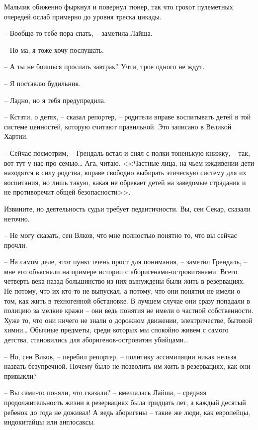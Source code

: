 Мальчик обиженно фыркнул и повернул тюнер, так что грохот пулеметных очередей ослаб примерно до уровня треска цикады.

-- Вообще-то тебе пора спать, -- заметила Лайша.

-- Но ма, я тоже хочу послушать.

-- А ты не боишься проспать завтрак? Учти, трое одного не ждут.

-- Я поставлю будильник.

-- Ладно, но я тебя предупредила.

-- Кстати, о детях, -- сказал репортер, -- родители вправе воспитывать детей в той системе ценностей, которую считают правильной. Это записано в Великой Хартии.

-- Сейчас посмотрим, -- Грендаль встал и снял с полки тоненькую книжку, -- так, вот тут у нас про семью\ldots{} Ага, читаю. <<Частные лица, на чьем иждивении дети находятся в силу родства, вправе свободно выбирать этическую систему для их воспитания, но лишь такую, какая не обрекает детей на заведомые страдания и не противоречит общей безопасности>>.

Извините, но деятельность судьи требует педантичности. Вы, сен Секар, сказали неточно.

-- Не могу сказать, сен Влков, что мне полностью понятно то, что вы сейчас прочли.

-- На самом деле, этот пункт очень прост для понимания, -- заметил Грендаль, -- мне его объясняли на примере истории с аборигенами-островитянами. Всего четверть века назад большинство из них вынуждены были жить в резервациях. Не потому, что их кто-то не выпускал, а потому, что они понятия не имели о том, как жить в техногенной обстановке. В лучшем случае они сразу попадали в полицию за мелкие кражи -- они ведь понятия не имели о частной собственности. Хуже то, что они ничего не знали о дорожном движении, электричестве, бытовой химии\ldots{} Обычные предметы, среди которых мы спокойно живем с самого детства, становились для аборигенов-островитян убийцами\ldots{}

-- Но, сен Влков, -- перебил репортер, -- политику ассимиляции никак нельзя назвать безупречной. Почему было не позволить им жить в резервациях, как они привыкли?

-- Вы сами-то поняли, что сказали? -- вмешалась Лайша, -- средняя продолжительность жизни в резервациях была тридцать лет, а каждый десятый ребенок до года не доживал! А ведь аборигены -- такие же люди, как европейцы, индокитайцы или англосаксы.

